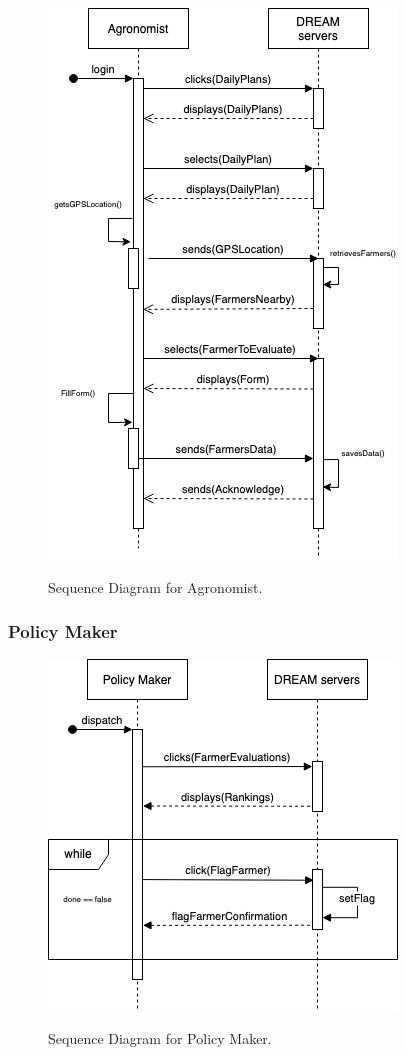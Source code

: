 \begin{figure}[hbt!]
\centering
\includegraphics[scale=0.6]{Files/sequence_disgrams/thePNGs/agronomist_sendReport.png}\\
\caption{\label{tab:addOne{figure_counter}}Sequence Diagram for Agronomist.}
\end{figure}

\subsubsection{Policy Maker}

\begin{figure}[hbt!]
\centering
\includegraphics[scale=0.6]{Files/sequence_disgrams/thePNGs/policy_setFlag.png}\\
\caption{\label{tab:addOne{figure_counter}}Sequence Diagram for Policy Maker.}
\end{figure}

